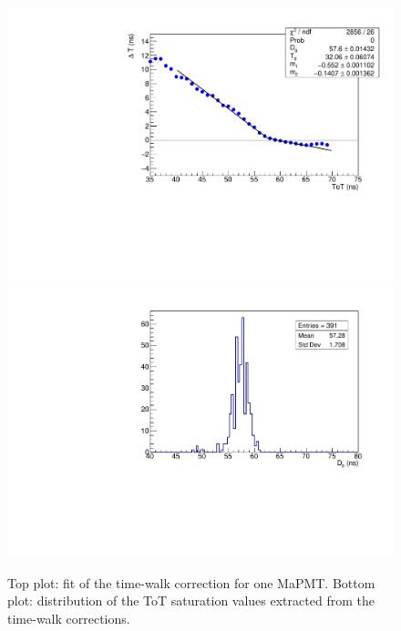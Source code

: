 \documentclass[5p,times,twocolumn]{elsarticle}
\begin{document}
\begin{figure}[t]
\begin{center}
\includegraphics[width=1.0\columnwidth]{time_walk_fit2.png}
\includegraphics[width=1.0\columnwidth]{Saturation_ToT3.png}
\end{center}
\caption{Top plot: fit of the time-walk correction for one MaPMT. Bottom plot: distribution of the ToT saturation
  values extracted from the time-walk corrections.}
\label{Fig:TimeWalk}
\end{figure}
\end{document}
